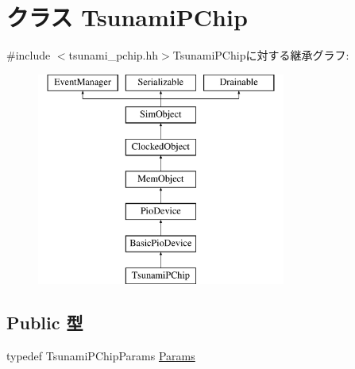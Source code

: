 \hypertarget{classTsunamiPChip}{
\section{クラス TsunamiPChip}
\label{classTsunamiPChip}
}


{\ttfamily \#include $<$tsunami\_\-pchip.hh$>$}TsunamiPChipに対する継承グラフ:\begin{figure}[H]
\begin{center}
\leavevmode
\includegraphics[height=7cm]{classTsunamiPChip}
\end{center}
\end{figure}
\subsection*{Public 型}
\begin{DoxyCompactItemize}
\item 
typedef TsunamiPChipParams \hyperlink{classTsunamiPChip_ad83d95a5c11dc8215f058bbac3c02dd6}{Params}
\end{DoxyCompactItemize}
